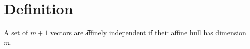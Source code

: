 
\section*{Definition}

A set of $m+1$ vectors are \t{affinely independent} if their affine hull has dimension $m$.

\blankpage